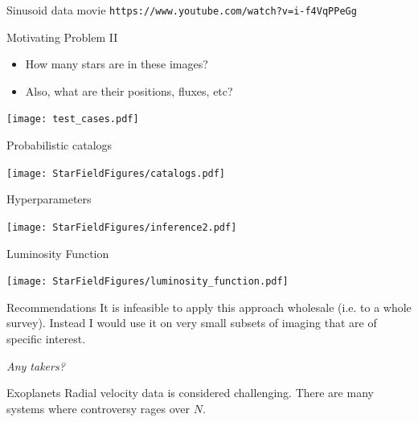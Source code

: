 \begin{frame}[t]{Sinusoid data movie}
{\tt https://www.youtube.com/watch?v=i-f4VqPPeGg}
\end{frame}

\begin{frame}[t]{Motivating Problem II}
\begin{itemize}
\item How many stars are in these images?
\item Also, what are their positions, fluxes, etc?
\end{itemize}
\begin{center}
\texttt{[image: test\_cases.pdf]}
\end{center}
\end{frame}

\begin{frame}[t]{Probabilistic catalogs}
\begin{center}
\texttt{[image: StarFieldFigures/catalogs.pdf]}
\end{center}
\end{frame}

\begin{frame}[t]{Hyperparameters}
\begin{center}
\texttt{[image: StarFieldFigures/inference2.pdf]}
\end{center}
\end{frame}

\begin{frame}[t]{Luminosity Function}
\begin{center}
\texttt{[image: StarFieldFigures/luminosity\_function.pdf]}
\end{center}
\end{frame}

\begin{frame}[t]{Recommendations}
It is infeasible to apply this approach wholesale (i.e. to a whole survey).
Instead I would use it on very small subsets of imaging that are of specific
interest.

\vspace{20pt}

\begin{center}
{\it Any takers?}
\end{center}
\end{frame}



\begin{frame}[t]{Exoplanets}
Radial velocity data is considered challenging. There are many systems where
controversy rages over $N$.
\end{frame}


